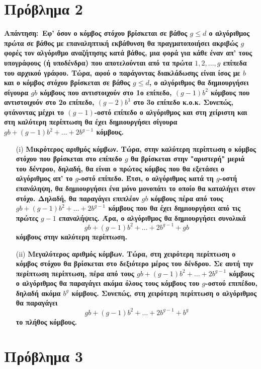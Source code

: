 \documentclass[12pt]{article}
\newcommand {\lat}{\latintext}
\theoremstyle{definition}
\begin{document}
\section*{Πρόβλημα 2}

\bf Απάντηση:\, \normalfont Εφ' όσον ο κόμβος στόχου βρίσκεται σε βάθος $g\leq d$ ο αλγόριθμος πρώτα σε βάθος με επαναληπτική εκβάθυνση θα πραγματοποιήσει ακριβώς $g$ φορές τον αλγόριθμο αναζήτησης κατά βάθος, μια φορά για κάθε έναν απ' τους υπογράφους (ή υποδένδρα) που αποτελούνται από τα πρώτα $1,2,\dots ,g$ επίπεδα του αρχικού γράφου. Τώρα, αφού ο παράγοντας διακλάδωσης είναι ίσος με $b$ και ο κόμβος στόχου βρίσκεται σε βάθος $g\leq d$, ο αλγόριθμος θα δημιουργήσει σίγουρα $gb$ κόμβους που αντιστοιχούν στο 1ο επίπεδο, $(g-1)b^2$ κόμβους που αντιστοιχούν στο 2ο επίπεδο, $(g-2)b^3$ στο 3ο επίπεδο κ.ο.κ. Συνεπώς, φτάνοντας μέχρι το $(g-1)$-οστό επίπεδο ο αλγόριθμος και στη χείριστη και στη καλύτερη περίπτωση θα έχει δημιουργήσει σίγουρα $gb + (g-1)b^2 + \dots +2b^{g-1}$ κόμβους. 
\begin{itemize}
    \item[{\lat (i)}]\bf Μικρότερος αριθμός κόμβων. \normalfont Τώρα, στην καλύτερη περίπτωση ο κόμβος στόχου που βρίσκεται στο επίπεδο $g$ θα βρίσκεται στην "αριστερή" μεριά του δέντρου, δηλαδή, θα είναι ο πρώτος κόμβος που θα εξετάσει ο αλγόριθμος απ' το $g$-οστό επίπεδο. Έτσι, ο αλγόριθμος κατά τη $g$-οστή επανάληψη, θα δημιουργήσει ένα μόνο μονοπάτι το οποίο θα καταλήγει στον στόχο. Δηλαδή, θα παραγάγει επιπλέον $gb$ κόμβους πέρα από τους $gb + (g-1)b^2 + \dots +2b^{g-1}$ κόμβους που θα έχει δημιουργήσει από τις πρώτες $g-1$ επαναλήψεις. Άρα, ο αλγόριθμος θα δημιουργήσει συνολικά
    \[
    gb + (g-1)b^2 + \dots +2b^{g-1} + gb
    \]
    \noindent κόμβους στην καλύτερη περίπτωση.
    \item[{\lat (ii)}] \bf Μεγαλύτερος αριθμός κόμβων. \normalfont Τώρα, στη χειρότερη περίπτωση ο κόμβος στόχου θα βρίσκεται στο δεξιότερο μέρος του δένδρου. Σε αυτή την περίπτωση περίπτωση, πέρα από τους $gb + (g-1)b^2 + \dots +2b^{g-1}$ κόμβους ο αλγόριθμος θα παραγάγει ακόμα όλους τους κόμβους του $g$-οστού επιπέδου, δηλαδή ακόμα $b^g$ κόμβους. Συνεπώς, στη χειρότερη περίπτωση ο αλγόριθμος θα παραγάγει 
    \[
    gb + (g-1)b^2 + \dots +2b^{g-1} + b^g
    \]
    το πλήθος κόμβους.
\end{itemize}

\vspace{3mm}

\section*{Πρόβλημα 3}
\end{document}
